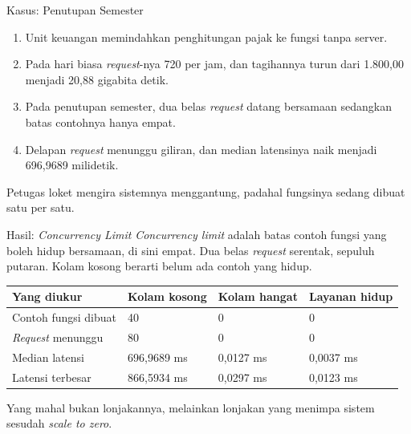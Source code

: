 \documentclass[aspectratio=169, table, 12pt]{beamer}
\begin{document}
\begin{frame}{{\Large Kasus: Penutupan Semester}}
  \vspace{8pt}
  \begin{enumerate}\small
    \item Unit keuangan memindahkan penghitungan pajak ke fungsi tanpa server.
    \item Pada hari biasa \textit{request}-nya 720 per jam, dan tagihannya turun
          dari 1.800,00 menjadi 20,88 gigabita detik.
    \item Pada penutupan semester, dua belas \textit{request} datang bersamaan
          sedangkan batas contohnya hanya empat.
    \item Delapan \textit{request} menunggu giliran, dan median latensinya naik
          menjadi 696,9689 milidetik.
  \end{enumerate}

  \vspace{8pt}
  {\small Petugas loket mengira sistemnya menggantung, padahal fungsinya
  sedang dibuat satu per satu.}
\end{frame}

\begin{frame}{{\Large Hasil: \textit{Concurrency Limit}}}
  \vspace{10pt}
  {\small \textit{Concurrency limit} adalah batas contoh fungsi yang boleh
  hidup bersamaan, di sini empat. Dua belas \textit{request} serentak, sepuluh
  putaran. Kolam kosong berarti belum ada contoh yang hidup.}

  \vspace{4pt}
  \centering
  \small
  \begin{tabularx}{0.96\textwidth}{|X|l|l|l|}
    \hline
    \textbf{Yang diukur} & \textbf{Kolam kosong} & \textbf{Kolam hangat} & \textbf{Layanan hidup} \\
    \hline
    Contoh fungsi dibuat & 40 & 0 & 0 \\
    \hline
    \textit{Request} menunggu & 80 & 0 & 0 \\
    \hline
    Median latensi & 696,9689 ms & 0,0127 ms & 0,0037 ms \\
    \hline
    Latensi terbesar & 866,5934 ms & 0,0297 ms & 0,0123 ms \\
    \hline
  \end{tabularx}

  \vspace{6pt}
  \raggedright
  {\small Yang mahal bukan lonjakannya, melainkan lonjakan yang menimpa sistem
  sesudah \textit{scale to zero}.}
\end{frame}
\end{document}
